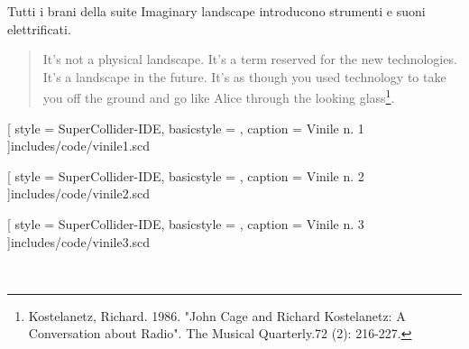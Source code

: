 Tutti i brani della suite Imaginary landscape introducono strumenti e suoni elettrificati.

\begin{quote}
It's not a physical landscape. It's a term reserved for the new technologies. It's a landscape in the future. It's as though you used technology to take you off the ground and go like Alice through the looking glass\footnote{Kostelanetz, Richard. 1986. "John Cage and Richard Kostelanetz: A Conversation about Radio". The Musical Quarterly.72 (2): 216-227.}.
\end{quote}



[
  style      = SuperCollider-IDE,
  basicstyle = \ttfamily\footnotesize,
  caption    = {Vinile n. 1}
]{includes/code/vinile1.scd}


[
  style      = SuperCollider-IDE,
  basicstyle = \ttfamily\footnotesize,
  caption    = {Vinile n. 2}
]{includes/code/vinile2.scd}


[
  style      = SuperCollider-IDE,
  basicstyle = \ttfamily\footnotesize,
  caption    = {Vinile n. 3}
]{includes/code/vinile3.scd}

\clearpage

~
